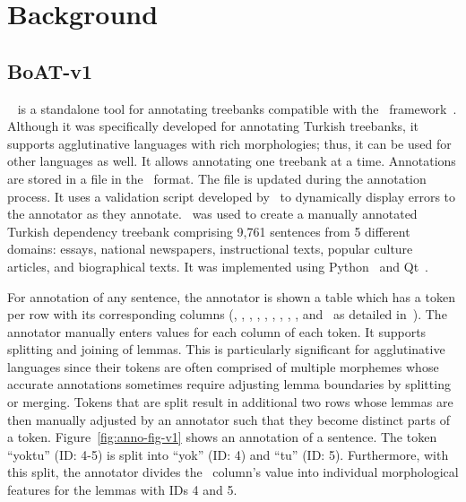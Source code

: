 \section{Background}
\label{sec:background}


\subsection{BoAT-v1}
\label{sec:boatvone}

\boatvone~\cite{anon} is a standalone tool for annotating treebanks compatible with the \ud\ framework~\cite{ud}.
Although it was specifically developed for annotating Turkish treebanks, it supports agglutinative languages with rich morphologies; thus, it can be used for other languages as well.
It allows annotating one treebank at a time.
Annotations are stored in a file in the \conllu\ format.
The file is updated during the annotation process.
It uses a validation script developed by \ud\ to dynamically display errors to the annotator as they annotate.
\boatvone\ was used to create a manually annotated Turkish dependency treebank comprising 9,761 sentences from 5 different domains: essays, national newspapers, instructional texts, popular culture articles, and biographical texts.
It was implemented using Python~\cite{python} and Qt~\cite{qt}.

For annotation of any sentence, the annotator is shown a table which has a token per row with its corresponding columns (\id, \form, \udlemma, \upos, \xpos, \feats, \head, \deprel, \deps, and \misc\ as detailed in~\cite{anon}).
The annotator manually enters values for each column of each token.
It supports splitting and joining of lemmas.
This is particularly significant for agglutinative languages since their tokens are often comprised of multiple morphemes whose accurate annotations sometimes require adjusting lemma boundaries by splitting or merging.
Tokens that are split result in additional two rows whose lemmas are then manually adjusted by an annotator such that they become distinct parts of a token.
Figure~\ref{fig:anno-fig-v1} shows an annotation of a sentence.
The token ``yoktu'' (ID: 4-5) is split into ``yok'' (ID: 4) and ``tu'' (ID: 5).
Furthermore, with this split, the annotator divides the \feats\ column's value into individual morphological features for the lemmas with IDs 4 and 5.

